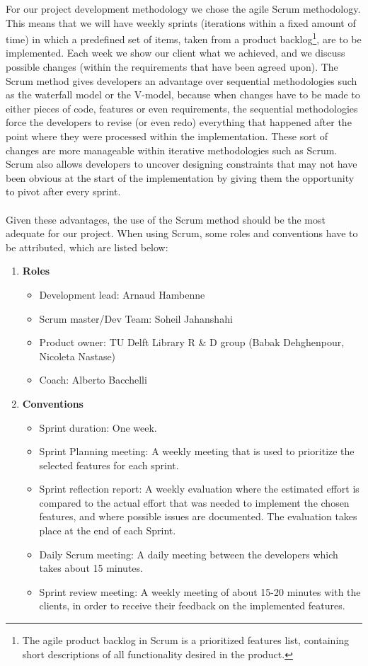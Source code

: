 For our project development methodology we chose the agile Scrum methodology. This means that we will have weekly sprints (iterations within a fixed amount of time) in which a predefined set of items, taken from a product backlog\footnote{The agile product backlog in Scrum is a prioritized features list, containing short descriptions of all functionality desired in the product.\cite{backlog} }, are to be implemented. Each week we show our client what we achieved, and we discuss possible changes (within the requirements that have been agreed upon). The Scrum method gives developers an advantage over sequential methodologies such as the waterfall model or the V-model, because when changes have to be made to either pieces of code, features or even requirements, the sequential methodologies force the developers to revise (or even redo) everything that happened after the point where they were processed within the implementation. These sort of changes are more manageable within iterative methodologies such as Scrum. Scrum also allows developers to uncover designing constraints that may not have been obvious at the start of the implementation by giving them the opportunity to pivot after every sprint. \\\\
Given these advantages, the use of the Scrum method should be the most adequate for our project. When using Scrum, some roles and conventions have to be attributed, which are listed below:

\begin{enumerate}
	\item \textbf{Roles}
		\begin{itemize}
			\item Development lead: Arnaud Hambenne
			\item Scrum master/Dev Team: Soheil Jahanshahi
			\item Product owner: TU Delft Library R \& D group  (Babak Dehghenpour, Nicoleta Nastase)
			\item Coach: Alberto Bacchelli
		\end{itemize}
		\newpage
	\item \textbf{Conventions}	
\begin{itemize}
		\item Sprint duration: One week.
		\item Sprint Planning meeting: A weekly meeting that is used to prioritize the selected features for each sprint. 
		\item Sprint reflection report: A weekly evaluation where the estimated effort is compared to the actual effort that was needed to implement the chosen features, and where possible issues are documented. The evaluation takes place at the end of each Sprint.
		\item Daily Scrum meeting: A daily meeting between the developers which takes about 15 minutes.
		\item Sprint review meeting: A weekly meeting of about 15-20 minutes with the clients, in order to receive their feedback on the implemented features.
\end{itemize}
\end{enumerate}


